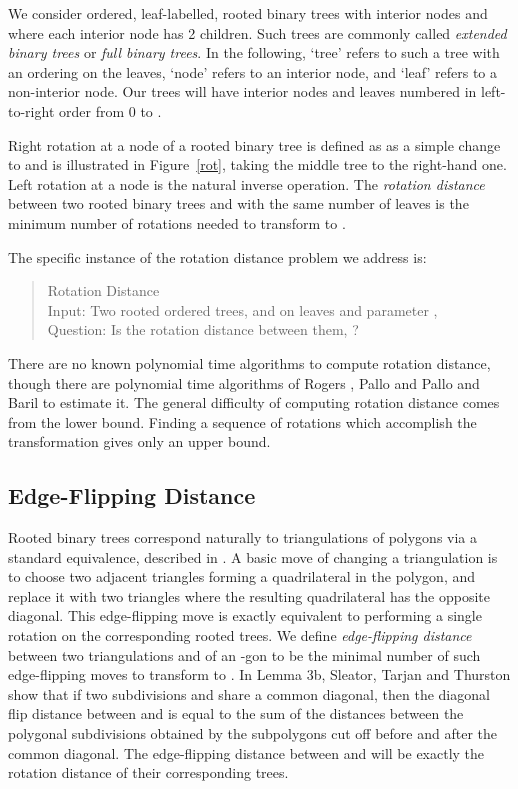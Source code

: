 \documentclass[12pt]{article}
\begin{document}
We consider ordered, leaf-labelled, rooted binary trees with  interior nodes and
where each interior node has 2 children.  Such trees are
commonly called {\em extended binary trees} \cite{knuth3} or  {\em full binary trees}.
In the following, `tree' refers to such a tree with an ordering on the leaves, `node' refers
to an interior node, and `leaf' refers to a non-interior node.
Our trees will have  interior nodes and   leaves numbered in left-to-right order
from 0 to .

Right rotation at a node of a rooted binary tree is defined as as a simple change to
 and is illustrated in
Figure~\ref{rot}, taking the middle tree to the right-hand one. Left rotation at a node is
the natural inverse operation.
The
{\em rotation distance}
 between two rooted binary trees
 and
 with the same number of leaves is the minimum number of rotations
needed to transform  to .

The specific instance of the rotation distance problem we address is:
\begin{quote}
{\sc Rotation Distance}\\
{\sc Input:} Two rooted ordered trees,  and  on 
 leaves and parameter ,\\
{\sc Question:} Is the rotation distance between them, ?
\end{quote}

There are no known polynomial time algorithms to compute rotation distance, though there are polynomial time algorithms of Rogers \cite{rogers}, Pallo\cite{pallo} and Pallo and Baril \cite{barilpallo} to estimate it.
The general difficulty of computing rotation distance comes from the lower bound.  Finding a sequence of rotations which accomplish the transformation gives only an upper bound.    

\subsection*{Edge-Flipping Distance}

Rooted binary trees correspond naturally to triangulations of polygons via a standard equivalence, described in \cite{stt}.  A basic move of changing a triangulation is to choose two adjacent triangles forming a quadrilateral in the polygon, and replace it with two triangles where the resulting quadrilateral has the opposite diagonal.  This edge-flipping move is exactly equivalent to performing a single rotation on the corresponding rooted trees.   We define {\em edge-flipping distance} between two triangulations  and  of an -gon to be the minimal number of such edge-flipping moves to transform  to .  
In Lemma 3b, Sleator, Tarjan and Thurston  \cite{stt} 
show that if two subdivisions  and  share a common diagonal, then 
the diagonal flip distance between  and  is equal to the sum 
of the distances between the polygonal subdivisions obtained by the subpolygons
cut off before and after the common diagonal.   
The edge-flipping distance between  and  will be exactly the rotation distance of their corresponding trees.
\end{document}
